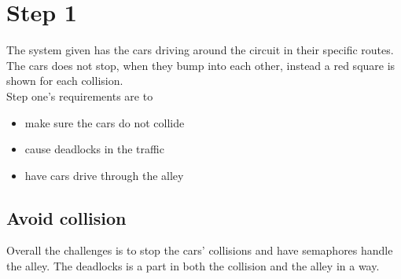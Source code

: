 \section{Step 1}
The system given has the cars driving around the circuit in their specific routes. The cars does not stop, when they bump into each other, instead a red square is shown for each collision.
\\

Step one's requirements are to
\begin{itemize}
\item make sure the cars do not collide
\item cause deadlocks in the traffic
\item have cars drive through the alley
\end{itemize}

\subsection{Avoid collision}
Overall the challenges is to stop the cars' collisions and have semaphores handle the alley. The deadlocks is a part in both the collision and the alley in a way.

